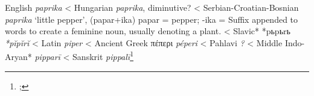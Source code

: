 \begin{etymology}\label{ety:paprika}
English \textit{paprika}
< Hungarian \textit{paprika}, diminutive?
< Serbian-Croatian-Bosnian \textit{paprika} `little pepper', (papar+ika) papar = pepper; -ika = Suffix appended to words to create a feminine noun, usually denoting a plant.
< Slavic* {*pьpьrь} \textit{*pĭpĭrĭ }
< Latin \textit{piper}
< Ancient Greek {πέπερι} \textit{péperi}
< Pahlavi \textit{?}
< Middle Indo-Aryan* \textit{pipparī}
< Sanskrit \textit{pippalī}\footnote{; }
\end{etymology}